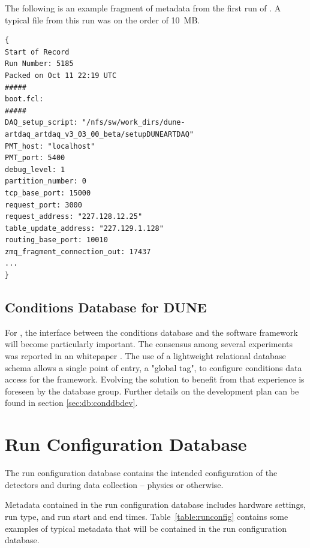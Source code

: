 \documentclass[../main-v1.tex]{subfiles}
\begin{document}
The following is an example fragment of  metadata from the first run of  . A typical file from this run was on the order of 10~MB.  

\begin{verbatim}
{
Start of Record
Run Number: 5185
Packed on Oct 11 22:19 UTC
#####
boot.fcl:
#####
DAQ_setup_script: "/nfs/sw/work_dirs/dune-artdaq_artdaq_v3_03_00_beta/setupDUNEARTDAQ" 
PMT_host: "localhost" 
PMT_port: 5400 
debug_level: 1 
partition_number: 0 
tcp_base_port: 15000 
request_port: 3000 
request_address: "227.128.12.25" 
table_update_address: "227.129.1.128" 
routing_base_port: 10010 
zmq_fragment_connection_out: 17437 
...
}
\end{verbatim}


\subsection{Conditions Database for DUNE}

For , the interface between the conditions database and the software framework will become particularly important.  The consensus among several  experiments was reported in an  whitepaper \cite{Laycock:2019ynk}. The use of a lightweight relational database schema allows a single point of entry, a "global tag", to configure conditions data access for the framework.  Evolving the  solution to benefit from that experience is foreseen by the database group. Further details on the development plan can be found in section \ref{sec:db:conddbdev}.

\section{Run Configuration Database  }
\label{sec:db:config}  

The run configuration database contains the intended configuration of the detectors and  during data collection -- physics or otherwise. 

Metadata contained in the run configuration database includes hardware settings, run type, and run start and end times. Table~\ref{table:runconfig} contains some examples of typical metadata that will be contained in the run configuration database. 
\end{document}
